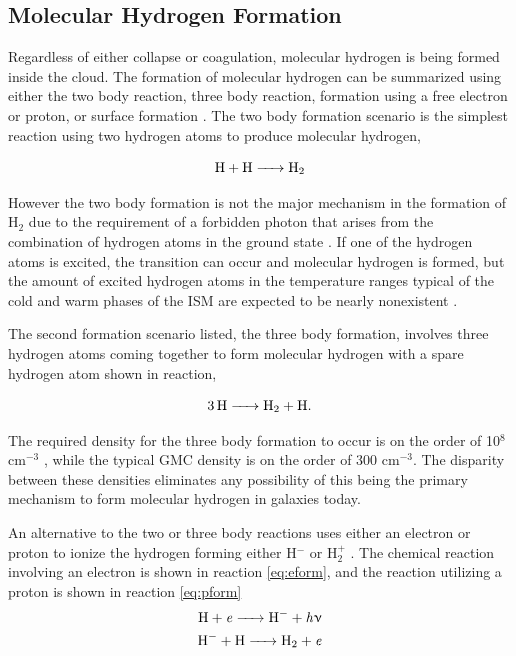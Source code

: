 \subsection{Molecular Hydrogen Formation}\label{h2form}

Regardless of either collapse or coagulation, molecular hydrogen is being formed inside the cloud.  The formation of molecular hydrogen can be summarized using either the two body reaction, three body reaction, formation using a free electron or proton, or surface formation \citep{krumholz2014}.  The two body formation scenario is the simplest reaction using two hydrogen atoms to produce molecular hydrogen,

\begin{equation}\label{eq:2bod}
  \ce{H + H -> H_2}
\end{equation}

However the two body formation is not the major mechanism in the formation of H$_2$ due to the requirement of a forbidden photon that arises from the combination of hydrogen atoms in the ground state \citep{gould1963}.  If one of the hydrogen atoms is excited, the transition can occur and molecular hydrogen is formed, but the amount of excited hydrogen atoms in the temperature ranges typical of the cold and warm phases of the ISM are expected to be nearly nonexistent \citep{krumholz2014}.

The second formation scenario listed, the three body formation, involves three hydrogen atoms coming together to form molecular hydrogen with a spare hydrogen atom shown in reaction,

\begin{equation}\label{eq:3bod}
  \ce{3H -> H_2 + H}.
\end{equation}

The required density for the three body formation to occur is on the order of 10$^8$ cm$^{-3}$ \citep{palla1983,abel1997}, while the typical GMC density is on the order of 300 cm$^{-3}$.  The disparity between these densities eliminates any possibility of this being the primary mechanism to form molecular hydrogen in galaxies today. 

An alternative to the two or three body reactions uses either an electron or proton to ionize the hydrogen forming either H$^-$ or H$_2^+$ \citep{krumholz2014}.  The chemical reaction involving an electron is shown in reaction \ref{eq:eform}, and the reaction utilizing a proton is shown in reaction \ref{eq:pform}
\begin{equation}\label{eq:eform}
  \begin{split}
    \ce{H + \it{e} -> H^- + \it{h\nu}} \\
    \ce{H^- + H -> H_2 + \it{e}}
  \end{split}
\end{equation}


